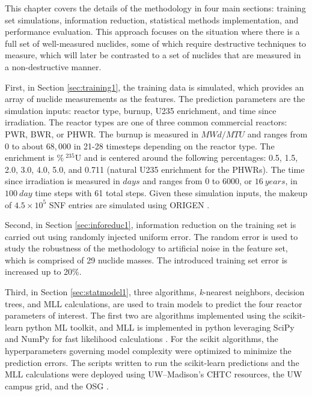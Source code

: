 This chapter covers the details of the methodology in four main sections:
training set simulations, information reduction, statistical methods
implementation, and performance evaluation. This approach focuses on the
situation where there is a full set of well-measured nuclides, some of which
require destructive techniques to measure, which will later be contrasted to a
set of nuclides that are measured in a non-destructive manner. 

First, in Section \ref{sec:training1}, the training data is simulated, which
provides an array of nuclide measurements as the features. The prediction
parameters are the simulation inputs: reactor type, burnup, \gls{U235}
enrichment, and time since irradiation.  The reactor types are one of three
common commercial reactors: \gls{PWR}, \gls{BWR}, or \gls{PHWR}.  The burnup is
measured in $MWd/MTU$ and ranges from 0 to about $68,000$ in 21-28 timesteps
depending on the reactor type.  The enrichment is $\%\:{}^{235}\text{U}$ and is
centered around the following percentages: 0.5, 1.5, 2.0, 3.0, 4.0, 5.0, and
0.711 (natural \gls{U235} enrichment for the \gls{PHWR}s).  The time since
irradiation is measured in $days$ and ranges from 0 to 6000, or $16\:years$, in
$100\:day$ time steps with 61 total steps. Given these simulation inputs, the
makeup of $4.5 \times 10^5$ \gls{SNF} entries are simulated using \gls{ORIGEN}
\cite{scale, origen, origenarp}.

Second, in Section \ref{sec:inforeduc1}, information reduction on the training
set is carried out using randomly injected uniform error. The random error is
used to study the robustness of the methodology to artificial noise in the
feature set, which is comprised of 29 nuclide masses.  The introduced training
set error is increased up to 20\%.

Third, in Section \ref{sec:statmodel1}, three algorithms, \textit{k}-nearest
neighbors, decision trees, and \gls{MLL} calculations, are used to train models
to predict the four reactor parameters of interest.  The first two are
algorithms implemented using the scikit-learn python \gls{ML} toolkit, and
\gls{MLL} is implemented in python leveraging SciPy and NumPy for fast
likelihood calculations \cite{scikit, scipy, numpy}.  For the scikit
algorithms, the hyperparameters governing model complexity were optimized to
minimize the prediction errors.  The scripts written to run the scikit-learn
predictions and the \gls{MLL} calculations were deployed using
\gls{UW}--Madison's \gls{CHTC} resources, the \gls{UW} campus grid, and the
\gls{OSG} \cite{osg07, osg09}.  


